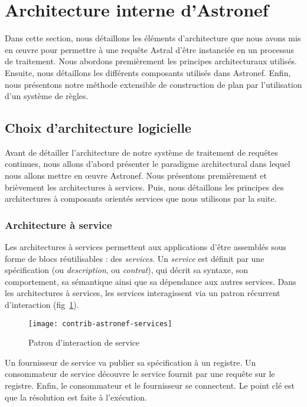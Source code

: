 \section{Architecture interne d'Astronef}\label{sec:contrib:astronef:architecture}
Dans cette section, nous détaillons les éléments d'architecture que nous avons mis en œuvre pour permettre à une requête Astral d'être instanciée en un processus de traitement. Nous abordons premièrement les principes architecturaux utilisés. Ensuite, nous détaillons les différents composants utilisés dans Astronef. Enfin, nous présentons notre méthode extensible de construction de plan par l'utilisation d'un système de règles.
\subsection{Choix d'architecture logicielle}
Avant de détailler l'architecture de notre système de traitement de requêtes continues, nous allons d'abord présenter le paradigme architectural dans lequel nous allons mettre en œuvre Astronef. Nous présentons premièrement et brièvement les architectures à services. Puis, nous détaillons les principes des architectures à composants orientés services que nous utilisons par la suite.
\subsubsection{Architecture à service}
Les architectures à services permettent aux applications d'être assemblés sous forme de blocs réutilisables : des \textit{services}. Un \textit{service} est définit par une spécification (ou \textit{description}, ou \textit{contrat}), qui décrit sa syntaxe, son comportement, sa sémantique ainsi que sa dépendance aux autres services. Dans les architectures à services, les services interagissent via un patron récurrent d'interaction (fig~\ref{fig:contrib:astronef:services}). 
\begin{figure}[ht]
    \centering
    \texttt{[image: contrib-astronef-services]}
    \caption{Patron d'interaction de service}\label{fig:contrib:astronef:services}
\end{figure}
Un fournisseur de service va publier sa spécification à un registre. Un consommateur de service découvre le service fournit par une requête sur le registre. Enfin, le consommateur et le fournisseur se connectent. Le point clé est que la résolution est faite à l'exécution.


